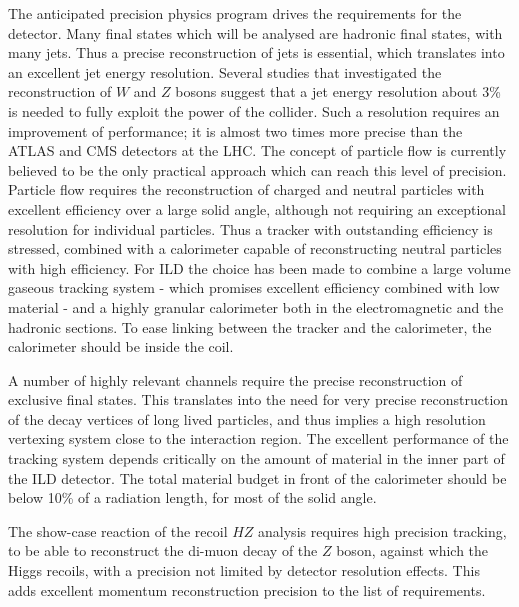 \documentclass[%
 amsmath,amssymb,
 aps,
 longbibliography,
]{revtex4-1}
\begin{document}

The anticipated precision physics program drives the requirements for the detector. Many final states which will be analysed are hadronic final states, with many jets. Thus a precise reconstruction of jets is essential, which translates into an excellent jet energy resolution. Several studies that investigated the reconstruction of $W$ and $Z$ bosons suggest that a jet energy resolution about 3\% is needed to fully exploit the power of the collider. Such a resolution requires an improvement of performance; it is almost two times more precise than the ATLAS and CMS detectors at the LHC. The concept of particle flow is currently believed to be the only practical approach which can reach this level of precision. Particle flow requires the reconstruction of charged and neutral particles with excellent efficiency over a large solid angle, although not requiring an exceptional  resolution for individual particles. Thus a tracker with outstanding efficiency is stressed, combined with a calorimeter capable of reconstructing neutral particles with high efficiency. For ILD the choice has been made to combine a large volume gaseous tracking system - which promises excellent efficiency combined with low material - and a highly granular calorimeter both in the electromagnetic and the hadronic sections. To ease linking between the tracker and the calorimeter, the calorimeter should be inside the coil. 

A number of highly relevant channels require the precise reconstruction of exclusive final states. This translates into the need for very precise reconstruction of the decay vertices of long lived particles, and thus implies a high resolution vertexing system close to the interaction region. 
The excellent performance of the tracking system depends critically on the amount of material in the inner part of the ILD detector. The total material budget in front of the calorimeter should be below 10\% of a radiation length, for most of the solid angle.


The show-case reaction of the recoil $HZ$ analysis requires high precision tracking, to be able to reconstruct the di-muon decay of the $Z$ boson, against which the Higgs recoils, with a precision not limited by detector resolution effects. This adds excellent momentum reconstruction precision to the list of requirements. 
\end{document}

